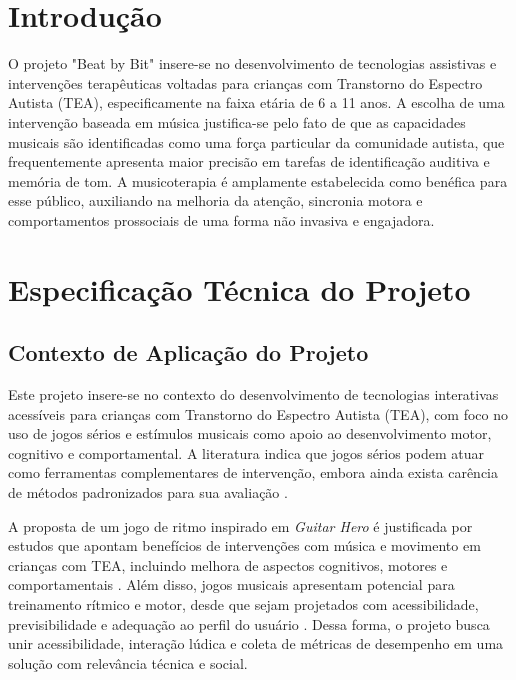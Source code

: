 \documentclass[a4paper,12pt,twoside]{article}
\begin{document}
\tableofcontents
\clearpage

\section{Introdução}\label{introduuxe7uxe3o}

O projeto "Beat by Bit" insere-se no desenvolvimento de tecnologias assistivas e intervenções terapêuticas voltadas para crianças com Transtorno do Espectro Autista (TEA), especificamente na faixa etária de 6 a 11 anos. A escolha de uma intervenção baseada em música justifica-se pelo fato de que as capacidades musicais são identificadas como uma força particular da comunidade autista, que frequentemente apresenta maior precisão em tarefas de identificação auditiva e memória de tom. A musicoterapia é amplamente estabelecida como benéfica para esse público, auxiliando na melhoria da atenção, sincronia motora e comportamentos prossociais de uma forma não invasiva e engajadora.

\section{Especificação Técnica do
Projeto}\label{especificauxe7uxe3o-tuxe9cnica-do-projeto}



\subsection{Contexto de Aplicação do
Projeto}\label{contexto-de-aplicauxe7uxe3o-do-projeto}

Este projeto insere-se no contexto do desenvolvimento de tecnologias interativas acessíveis para crianças com Transtorno do Espectro Autista (TEA), com foco no uso de jogos sérios e estímulos musicais como apoio ao desenvolvimento motor, cognitivo e comportamental. A literatura indica que jogos sérios podem atuar como ferramentas complementares de intervenção, embora ainda exista carência de métodos padronizados para sua avaliação \cite{carvalho2024}.

A proposta de um jogo de ritmo inspirado em \emph{Guitar Hero} é justificada por estudos que apontam benefícios de intervenções com música e movimento em crianças com TEA, incluindo melhora de aspectos cognitivos, motores e comportamentais \cite{kanzari2025,dobesh2023}. Além disso, jogos musicais apresentam potencial para treinamento rítmico e motor, desde que sejam projetados com acessibilidade, previsibilidade e adequação ao perfil do usuário \cite{begel2017,bagchi2023}. Dessa forma, o projeto busca unir acessibilidade, interação lúdica e coleta de métricas de desempenho em uma solução com relevância técnica e social.
\end{document}
